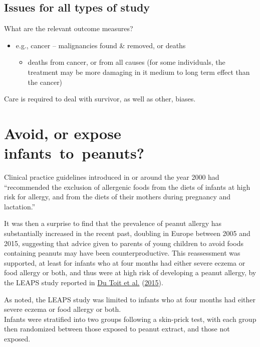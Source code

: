 \documentclass[
  10pt,
  b5paper]{book}
\providecommand{\tightlist}{%
  \setlength{\itemsep}{0pt}\setlength{\parskip}{0pt}}
\begin{document}
\hypertarget{issues-for-all-types-of-study}{%
\subsection*{Issues for all types of study}\label{issues-for-all-types-of-study}}

What are the relevant outcome measures?

\begin{itemize}
\tightlist
\item
  e.g., cancer -- malignancies found \& removed, or deaths

  \begin{itemize}
  \tightlist
  \item
    deaths from cancer, or from all causes (for some individuals,
    the treatment may be more damaging in it medium to long term effect
    than the cancer)
  \end{itemize}
\end{itemize}

Care is required to deal with survivor, as well as other, biases.

\hypertarget{avoid-or-expose-infants-to-peanuts}{%
\section{Avoid, or expose infants~to~peanuts?}\label{avoid-or-expose-infants-to-peanuts}}

Clinical practice guidelines introduced in or around the
year 2000 had ``recommended the exclusion of
allergenic foods from the diets of infants at high risk for
allergy, and from the diets of their mothers during pregnancy
and lactation.''

It was then a surprise to find that
the prevalence of peanut allergy has substantially increased
in the recent past, doubling in Europe between 2005 and 2015,
suggesting that advice given to parents of young children to
avoid foods containing peanuts may have been counterproductive.
This reassessment was supported, at least for infants who
at four months had either severe eczema or food allergy or
both, and thus were at high risk of developing a peanut
allergy, by the LEAPS study reported in \protect\hyperlink{ref-du2015randomized}{Du Toit et al.} (\protect\hyperlink{ref-du2015randomized}{2015}).

As noted, the LEAPS study was limited to infants who at four
months had either severe eczema or food allergy or both.\\
Infants were stratified into two groups following a skin-prick
test, with each group then randomized between those exposed
to peanut extract, and those not exposed.
\end{document}
